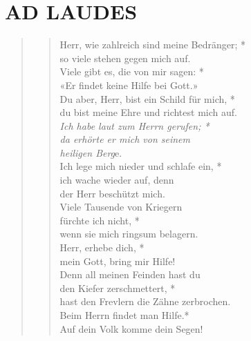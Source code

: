 \medskip

\begin{flushleft}


\end{flushleft}


\section[LAUDES]{AD LAUDES}

\def\greinitialformat#1{{\fontsize{40}{40}\selectfont #1}}
\gresetfirstlineaboveinitial{\small \textcolor{red}{ Ps 3}}{}
\setaboveinitialseparation{0.72mm}


\vspace{0.3cm}


\begin{quote}
\begin{verse}
Herr, wie zahlreich sind meine Bedränger; *\\
so viele stehen gegen mich auf.\\ 
\vin Viele gibt es, die von mir sagen: *\\ 
\vin «Er findet keine Hilfe bei Gott.» \\
Du aber, Herr, bist ein Schild für mich, *\\
du bist meine Ehre und richtest mich auf.\\ 
\vin \textit{Ich habe laut zum Herrn gerufen; *\\ 
\vin da erhörte er mich von seinem \\
\vin heiligen Berg}e.\\ 
Ich lege mich nieder und schlafe ein, *\\
ich wache wieder auf, denn\\
der Herr beschützt mich.\\ 
\vin Viele Tausende von Kriegern\\ 
\vin fürchte ich nicht, *\\ 
\vin wenn sie mich ringsum belagern.\\ 
Herr, erhebe dich, *\\
mein Gott, bring mir Hilfe! \\ 
\vin Denn all meinen Feinden hast du \\ 
\vin den Kiefer zerschmettert, *\\ 
\vin hast den Frevlern die Zähne zerbrochen.\\
Beim Herrn findet man Hilfe.*\\
Auf dein Volk komme dein Segen! \\
\end{verse}
\end{quote}

